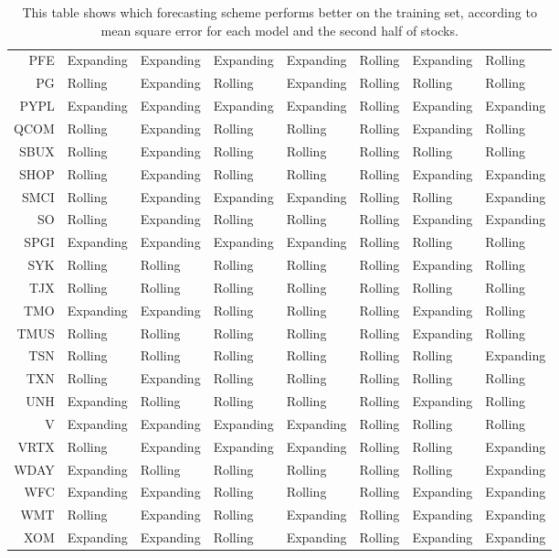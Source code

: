 \begin{table}[ht]
\begin{tabular}{rlllllll}
  PFE & Expanding & Expanding & Expanding & Expanding & Rolling & Expanding & Rolling \\ 
  PG & Rolling & Expanding & Rolling & Expanding & Rolling & Rolling & Rolling \\ 
  PYPL & Expanding & Expanding & Expanding & Expanding & Rolling & Expanding & Expanding \\ 
  QCOM & Rolling & Expanding & Rolling & Rolling & Rolling & Expanding & Rolling \\ 
  SBUX & Rolling & Expanding & Rolling & Rolling & Rolling & Rolling & Rolling \\ 
  SHOP & Rolling & Expanding & Rolling & Rolling & Rolling & Expanding & Expanding \\ 
  SMCI & Rolling & Expanding & Expanding & Expanding & Rolling & Rolling & Expanding \\ 
  SO & Rolling & Expanding & Rolling & Rolling & Rolling & Expanding & Expanding \\ 
  SPGI & Expanding & Expanding & Expanding & Expanding & Rolling & Rolling & Rolling \\ 
  SYK & Rolling & Rolling & Rolling & Rolling & Rolling & Expanding & Rolling \\ 
  TJX & Rolling & Rolling & Rolling & Rolling & Rolling & Rolling & Rolling \\ 
  TMO & Expanding & Expanding & Rolling & Rolling & Rolling & Expanding & Rolling \\ 
  TMUS & Rolling & Rolling & Rolling & Rolling & Rolling & Expanding & Rolling \\ 
  TSN & Rolling & Rolling & Rolling & Rolling & Rolling & Rolling & Expanding \\ 
  TXN & Rolling & Expanding & Rolling & Rolling & Rolling & Rolling & Rolling \\ 
  UNH & Expanding & Rolling & Rolling & Rolling & Rolling & Expanding & Rolling \\ 
  V & Expanding & Expanding & Expanding & Expanding & Rolling & Rolling & Rolling \\ 
  VRTX & Rolling & Expanding & Expanding & Expanding & Rolling & Rolling & Expanding \\ 
  WDAY & Expanding & Rolling & Rolling & Rolling & Rolling & Rolling & Expanding \\ 
  WFC & Expanding & Expanding & Rolling & Rolling & Rolling & Expanding & Expanding \\ 
  WMT & Rolling & Expanding & Rolling & Expanding & Rolling & Expanding & Expanding \\ 
  XOM & Expanding & Expanding & Rolling & Expanding & Rolling & Expanding & Expanding \\ 
   \hline
\end{tabular}
\caption[Better scheme MSE (2)]{This table shows which forecasting scheme performs better on the training set, according to mean square error
              for each model and the second half of stocks.} 
\label{Table:Better_MSE_2}
\end{table}
